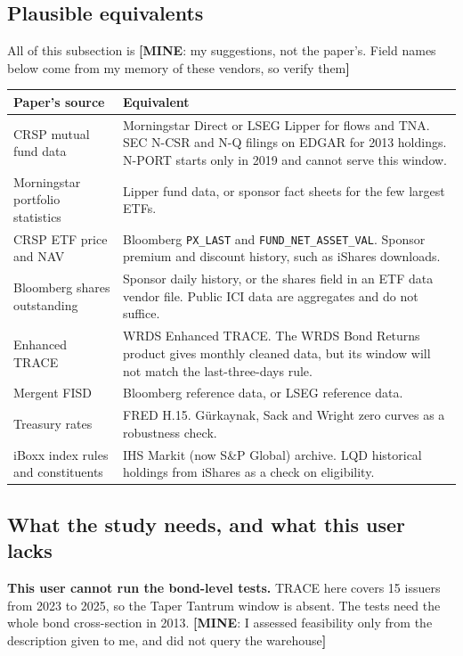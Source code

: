 \documentclass[10pt,a4paper]{article}
\newcommand{\MY}[1]{\textcolor{cmy}{\textbf{[MINE}: #1\textbf{]}}}
\begin{document}
\subsection{Plausible equivalents}
All of this subsection is \MY{my suggestions, not the paper's. Field names below come from my memory of these vendors, so verify them}
\begin{longtable}{@{}P{4cm}P{13cm}@{}}
\toprule
Paper's source & Equivalent\\
\midrule\endhead
CRSP mutual fund data & Morningstar Direct or LSEG Lipper for flows and TNA. SEC N-CSR and N-Q filings on EDGAR for 2013 holdings. N-PORT starts only in 2019 and cannot serve this window.\\
Morningstar portfolio statistics & Lipper fund data, or sponsor fact sheets for the few largest ETFs.\\
CRSP ETF price and NAV & Bloomberg \texttt{PX\_LAST} and \texttt{FUND\_NET\_ASSET\_VAL}. Sponsor premium and discount history, such as iShares downloads.\\
Bloomberg shares outstanding & Sponsor daily history, or the shares field in an ETF data vendor file. Public ICI data are aggregates and do not suffice.\\
Enhanced TRACE & WRDS Enhanced TRACE. The WRDS Bond Returns product gives monthly cleaned data, but its window will not match the last-three-days rule.\\
Mergent FISD & Bloomberg reference data, or LSEG reference data.\\
Treasury rates & FRED H.15. Gürkaynak, Sack and Wright zero curves as a robustness check.\\
iBoxx index rules and constituents & IHS Markit (now S\&P Global) archive. LQD historical holdings from iShares as a check on eligibility.\\
\bottomrule
\end{longtable}

\subsection{What the study needs, and what this user lacks}\label{sec:need}
\textbf{This user cannot run the bond-level tests.} TRACE here covers 15 issuers from 2023 to 2025, so the Taper Tantrum window is absent. The tests need the whole bond cross-section in 2013. \MY{I assessed feasibility only from the description given to me, and did not query the warehouse}
\end{document}
